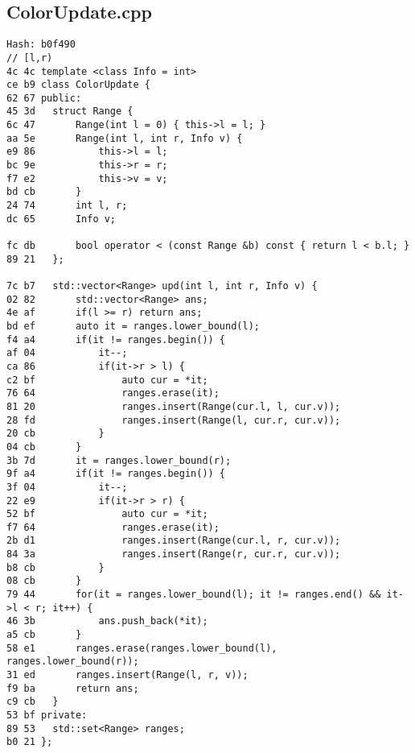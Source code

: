 \documentclass[11pt, a4paper, twoside]{article}
\begin{document}
\subsection{ColorUpdate.cpp}
\begin{lstlisting}
Hash: b0f490
// [l,r)
4c 4c template <class Info = int>
ce b9 class ColorUpdate {
62 67 public:
45 3d 	struct Range {
6c 47 		Range(int l = 0) { this->l = l; }
aa 5e 		Range(int l, int r, Info v) {
e9 86 			this->l = l;
bc 9e 			this->r = r;
f7 e2 			this->v = v;
bd cb 		}
24 74 		int l, r;
dc 65 		Info v;
      
fc db 		bool operator < (const Range &b) const { return l < b.l; }
89 21 	};
      
7c b7 	std::vector<Range> upd(int l, int r, Info v) {
02 82 		std::vector<Range> ans;
4e af 		if(l >= r) return ans;
bd ef 		auto it = ranges.lower_bound(l);
f4 a4 		if(it != ranges.begin()) {
af 04 			it--;
ca 86 			if(it->r > l) {
c2 bf 				auto cur = *it;
76 64 				ranges.erase(it);
81 20 				ranges.insert(Range(cur.l, l, cur.v));
28 fd 				ranges.insert(Range(l, cur.r, cur.v));
20 cb 			}
04 cb 		}
3b 7d 		it = ranges.lower_bound(r);
9f a4 		if(it != ranges.begin()) {
3f 04 			it--;
22 e9 			if(it->r > r) {
52 bf 				auto cur = *it;
f7 64 				ranges.erase(it);
2b d1 				ranges.insert(Range(cur.l, r, cur.v));
84 3a 				ranges.insert(Range(r, cur.r, cur.v));
b8 cb 			}
08 cb 		}
79 44 		for(it = ranges.lower_bound(l); it != ranges.end() && it->l < r; it++) {
46 3b 			ans.push_back(*it);
a5 cb 		}
58 e1 		ranges.erase(ranges.lower_bound(l), ranges.lower_bound(r));
31 ed 		ranges.insert(Range(l, r, v));
f9 ba 		return ans;
c9 cb 	}
53 bf private:
89 53 	std::set<Range> ranges;
b0 21 };
\end{lstlisting}
\end{document}
